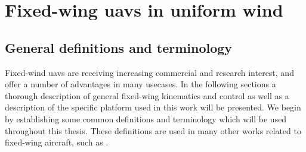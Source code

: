 
\chapter{Fixed-wing \acsp{uav} in uniform wind}\label{cha:fixed_wing_uav}
\section{General definitions and terminology}
Fixed-wind \acp{uav} are receiving increasing commercial and research interest, and offer a number of advantages in many usecases. In the following sections a thorough description of
general fixed-wing kinematics and control as well as a description of the specific platform used in this work will be presented. 
We begin by establishing some common definitions and terminology which will be used throughout this thesis. These definitions are 
 used in many other works related to fixed-wing aircraft, such as \cite{uav_dynamics_wind}. 

